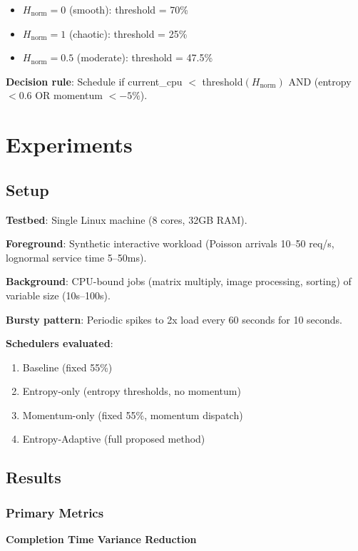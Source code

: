 \documentclass[11pt,letterpaper]{article}
\begin{document}
\begin{itemize}
  \item $H_{\text{norm}} = 0$ (smooth): threshold = 70\%
  \item $H_{\text{norm}} = 1$ (chaotic): threshold = 25\%
  \item $H_{\text{norm}} = 0.5$ (moderate): threshold = 47.5\%
\end{itemize}

\textbf{Decision rule}: Schedule if current\_cpu $<$ threshold$(H_{\text{norm}})$ AND (entropy $< 0.6$ OR momentum $< -5\%$).

\section{Experiments}

\subsection{Setup}

\textbf{Testbed}: Single Linux machine (8 cores, 32GB RAM).

\textbf{Foreground}: Synthetic interactive workload (Poisson arrivals 10--50 req/s, lognormal service time 5--50ms).

\textbf{Background}: CPU-bound jobs (matrix multiply, image processing, sorting) of variable size (10s--100s).

\textbf{Bursty pattern}: Periodic spikes to 2x load every 60 seconds for 10 seconds.

\textbf{Schedulers evaluated}:
\begin{enumerate}
  \item Baseline (fixed 55\%)
  \item Entropy-only (entropy thresholds, no momentum)
  \item Momentum-only (fixed 55\%, momentum dispatch)
  \item Entropy-Adaptive (full proposed method)
\end{enumerate}

\subsection{Results}

\subsubsection{Primary Metrics}

\textbf{Completion Time Variance Reduction}
\end{document}

